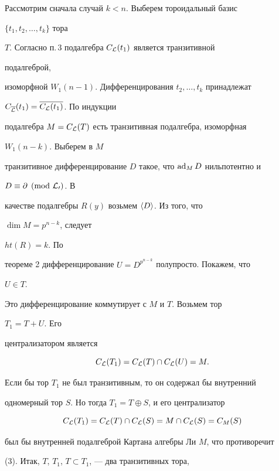 \begin{pf}


Рассмотрим сначала случай $k<n$. Выберем тороидальный базис\linebreak


$\{t_1,t_2,\dotsc,t_k\}$ тора


$T$. Согласно п.\,3 подалгебра $C_{\cal L}(t_1)$ является транзитивной


подалгеброй,


изоморфной $W_1(n-1)$. Дифференцирования $t_2,\dotsc,t_k$ принадлежат


$C_{\overline{\cal L}}(t_1)=\overline{C_{\cal L}(t_1)}$. По индукции


подалгебра $M=C_{\cal L}(T)$ есть транзитивная подалгебра, изоморфная


$W_1(n-k)$. Выберем в $M$


транзитивное дифференцирование $D$ такое, что $\operatorname{ad}_M D$ нильпотентно и


$D\equiv\partial\pmod{\cal L_0}$. В


качестве подалгебры $R(y)$ возьмем $\langle D\rangle$. Из того, что


$\dim M=p^{n-k}$, следует


$ht(R)=k$. По


теореме 2 дифференцирование $U=D^{p^{n-k}}$ полупросто. Покажем, что


$U\in T$.


Это дифференцирование коммутирует с $M$ и $T$. Возьмем тор


$T_1=T+U$. Его


централизатором является


\begin{equation}


C_{\cal L}(T_1)=C_{\cal L}(T)\cap C_{\cal L}(U)=M.


\end{equation}


Если бы тор $T_1$ не был транзитивным, то он содержал бы внутренний


одномерный тор $S$. Но тогда $T_1=T\oplus S$, и его централизатор


$$


C_{\cal L}(T_1)=C_{\cal L}(T)\cap C_{\cal L}(S)=


M\cap C_{\cal L}(S)=C_M(S)


$$


был бы внутренней подалгеброй Картана алгебры Ли $M$, что противоречит


(3). Итак, $T$, $T_1$, $T\subset T_1$, --- два транзитивных тора,



\end{pf}
